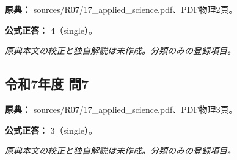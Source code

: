 \noindent\textbf{原典：} sources/R07/17\_applied\_science.pdf、PDF物理2頁。

\textbf{公式正答：} 4（single）。

\par\textit{原典本文の校正と独自解説は未作成。分類のみの登録項目。}

\subsection{令和7年度 問7}
\label{q:r07-reg-applied-07}

\noindent\textbf{原典：} sources/R07/17\_applied\_science.pdf、PDF物理3頁。

\textbf{公式正答：} 3（single）。

\par\textit{原典本文の校正と独自解説は未作成。分類のみの登録項目。}
